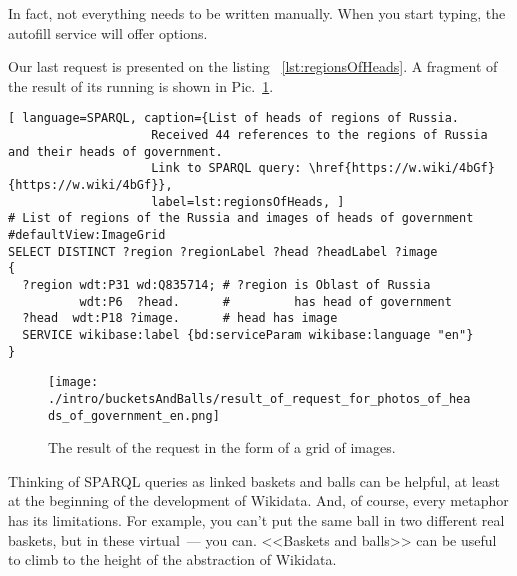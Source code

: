 In fact, not everything needs to be written manually. When you start typing, the autofill service will offer options.

Our last request is presented on the listing ~\ref{lst:regionsOfHeads}. A fragment of the result of its running is shown in Pic.~\ref{fig:Result_of_the_request}.

\begin{lstlisting}[ language=SPARQL, caption={List of heads of regions of Russia. 
                    Received 44 references to the regions of Russia and their heads of government. 
                    Link to SPARQL query: \href{https://w.wiki/4bGf}{https://w.wiki/4bGf}},
                    label=lst:regionsOfHeads, ]
# List of regions of the Russia and images of heads of government
#defaultView:ImageGrid
SELECT DISTINCT ?region ?regionLabel ?head ?headLabel ?image
{
  ?region wdt:P31 wd:Q835714; # ?region is Oblast of Russia
          wdt:P6  ?head.      #         has head of government
  ?head  wdt:P18 ?image.      # head has image
  SERVICE wikibase:label {bd:serviceParam wikibase:language "en"} 
}
\end{lstlisting}

\begin{figure}[h!]
\texttt{[image: ./intro/bucketsAndBalls/result\_of\_request\_for\_photos\_of\_heads\_of\_government\_en.png]}
\caption{The result of the request in the form of a grid of images.}
\label{fig:Result_of_the_request}
\end{figure}

Thinking of SPARQL queries as linked baskets and balls can be helpful, at least at the beginning of the development of Wikidata. And, of course, every metaphor has its limitations. For example, you can't put the same ball in two different real baskets, but in these virtual~--- you can. <<Baskets and balls>> can be useful to climb to the height of the abstraction of Wikidata.
